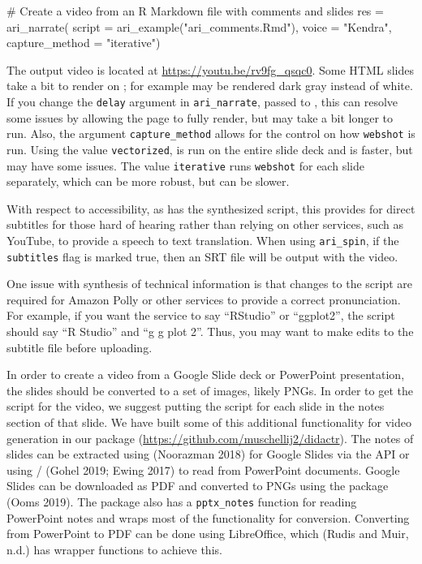 \begin{Schunk}
\begin{Sinput}
# Create a video from an R Markdown file with comments and slides
res = ari_narrate(
  script = ari_example("ari_comments.Rmd"),
  voice = "Kendra",
  capture_method = "iterative")
\end{Sinput}
\end{Schunk}

The output video is located at \url{https://youtu.be/rv9fg_qsqc0}. Some
HTML slides take a bit to render on ; for example may be
rendered dark gray instead of white. If you change the \texttt{delay}
argument in \texttt{ari\_narrate}, passed to , this can
resolve some issues by allowing the page to fully render, but may take a
bit longer to run. Also, the argument \texttt{capture\_method} allows
for the control on how \texttt{webshot} is run. Using the value
\texttt{vectorized},  is run on the entire slide deck and
is faster, but may have some issues. The value \texttt{iterative} runs
\texttt{webshot} for each slide separately, which can be more robust,
but can be slower.

With respect to accessibility, as  has the synthesized script,
this provides for direct subtitles for those hard of hearing rather than
relying on other services, such as YouTube, to provide a speech to text
translation. When using \texttt{ari\_spin}, if the \texttt{subtitles}
flag is marked true, then an SRT file will be output with the video.

One issue with synthesis of technical information is that changes to the
script are required for Amazon Polly or other services to provide a
correct pronunciation. For example, if you want the service to say
``RStudio'' or ``ggplot2'', the script should say ``R Studio'' and ``g g
plot 2''. Thus, you may want to make edits to the subtitle file before
uploading.

In order to create a video from a Google Slide deck or PowerPoint
presentation, the slides should be converted to a set of images, likely
PNGs. In order to get the script for the video, we suggest putting the
script for each slide in the notes section of that slide. We have built
some of this additional functionality for video generation in our
package  (\url{https://github.com/muschellij2/didactr}).
The notes of slides can be extracted using 
(Noorazman 2018) for Google Slides via the API or using
/ (Gohel 2019; Ewing 2017) to read
from PowerPoint documents. Google Slides can be downloaded as PDF and
converted to PNGs using the  package (Ooms 2019). The
 package also has a \texttt{pptx\_notes} function for
reading PowerPoint notes and wraps most of the functionality for
conversion. Converting from PowerPoint to PDF can be done using
LibreOffice, which  (Rudis and Muir, n.d.) has
wrapper functions to achieve this.

